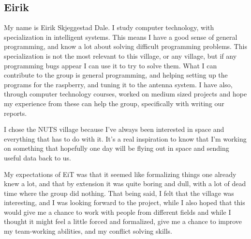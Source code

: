 \subsection{Eirik}
My name is Eirik Skjeggestad Dale. I study computer technology, with specialization in intelligent systems. This means I have a good sense of general programming, and know a lot about solving difficult programming problems. This specialization is not the most relevant to this village, or any village, but if any programming bugs appear I can use it to try to solve them. What I can contribute to the group  is general programming, and helping setting up the programs for the raspberry, and tuning it to the antenna system. I have also, through computer technology courses, worked on medium sized projects and hope my experience from these can help the group, specifically with writing our reports.

I chose the NUTS village because I've always been interested in space and everything that has to do with it. It's a real inspiration to know that I'm working on something that hopefully one day will be flying out in space and sending useful data back to us.

My expectations of EiT was that it seemed like formalizing things one already knew a lot, and that by extension it was quite boring and dull, with a lot of dead time where the group did nothing. That being said, I felt that the village was interesting, and I was looking forward to the project, while I also hoped that this would give me a chance to work with people from different fields and while I thought it might feel a little forced and formalized, give me a chance to improve my team-working abilities, and my conflict solving skills.